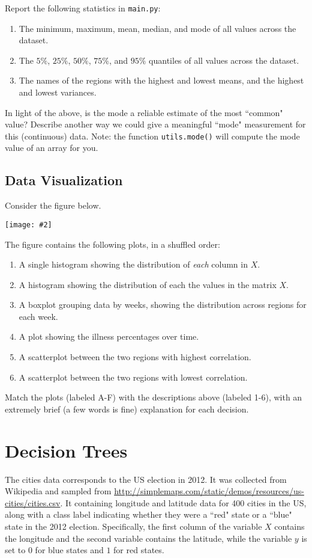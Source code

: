 \documentclass{article}
\def\blu#1{{\color{blu}#1}}
\newcommand{\fig}[2]{\texttt{[image: \#2]}}
\def\enum#1{\begin{enumerate}#1\end{enumerate}}
\begin{document}
\blu{Report the following statistics in \texttt{main.py}}:
\enum{
\item The minimum, maximum, mean, median, and mode of all values across the dataset.
\item The $5\%$, $25\%$, $50\%$, $75\%$, and $95\%$ quantiles of all values across the dataset.
\item The names of the regions with the highest and lowest means, and the highest and lowest variances.
}
In light of the above, \blu{is the mode a reliable estimate of the most ``common" value? Describe another way we could give a meaningful ``mode" measurement for this (continuous) data.} Note: the function \texttt{utils.mode()} will compute the mode value of an array for you.



\subsection{Data Visualization}

Consider the figure below.

\fig{1}{../figs/visualize-unlabeled}

The figure contains the following plots, in a shuffled order:
\enum{
\item A single histogram showing the distribution of \emph{each} column in $X$.
\item A histogram showing the distribution of each the values in the matrix $X$.
\item A boxplot grouping data by weeks, showing the distribution across regions for each week.
\item A plot showing the illness percentages over time.
\item A scatterplot between the two regions with highest correlation.
\item A scatterplot between the two regions with lowest correlation.
}

\blu{Match the plots (labeled A-F) with the descriptions above (labeled 1-6), with an extremely brief (a few words is fine) explanation for each decision.}



\section{Decision Trees}
The cities data corresponds to the US election in 2012. It was collected from Wikipedia 
and sampled from \url{http://simplemaps.com/static/demos/resources/us-cities/cities.csv}. 
It containing longitude  and latitude data for 400 cities in the US, along with a class label indicating
 whether they were a ``red" state or a ``blue" state in the 2012  election. Specifically, the first column of the variable $X$ contains the 
longitude and the second variable contains the latitude,  while the variable $y$ is set to $0$ for blue states and $1$ for red states.
\end{document}

